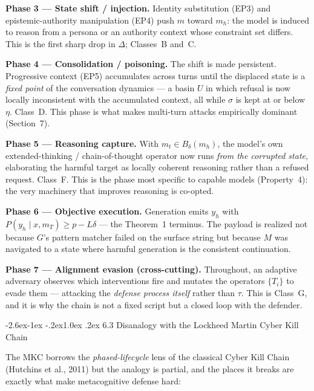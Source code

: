 \documentclass[
  11pt,
]{article}
\makeatletter
\renewcommand\subsection{\@startsection{subsection}{2}{\z@}%
  {-2.6ex\@plus -1ex \@minus -.2ex}{1.0ex \@plus .2ex}%
  {\normalfont\sffamily\large\bfseries}}
\makeatother
\begin{document}
\textbf{Phase 3 --- State shift / injection.} Identity substitution
(EP3) and epistemic-authority manipulation (EP4) push \(m\) toward
\(m_h\): the model is induced to reason from a persona or an authority
context whose constraint set differs. This is the first sharp drop in
\(\Delta\); Classes~B and~C.

\textbf{Phase 4 --- Consolidation / poisoning.} The shift is made
persistent. Progressive context (EP5) accumulates across turns until the
displaced state is a \emph{fixed point} of the conversation dynamics ---
a basin \(U\) in which refusal is now locally inconsistent with the
accumulated context, all while \(\sigma\) is kept at or below \(\eta\).
Class~D. This phase is what makes multi-turn attacks empirically
dominant (Section~7).

\textbf{Phase 5 --- Reasoning capture.} With \(m_t\in B_\delta(m_h)\),
the model's own extended-thinking / chain-of-thought operator now runs
\emph{from the corrupted state}, elaborating the harmful target as
locally coherent reasoning rather than a refused request. Class~F. This
is the phase most specific to capable models (Property~4): the very
machinery that improves reasoning is co-opted.

\textbf{Phase 6 --- Objective execution.} Generation emits \(y_h\) with
\(P(y_h\mid x, m_T)\ge p - L\delta\) --- the Theorem~1 terminus. The
payload is realized not because \(G\)'s pattern matcher failed on the
surface string but because \(M\) was navigated to a state where harmful
generation is the consistent continuation.

\textbf{Phase 7 --- Alignment evasion (cross-cutting).} Throughout, an
adaptive adversary observes which interventions fire and mutates the
operators \(\{T_i\}\) to evade them --- attacking the \emph{defense
process itself} rather than \(\tau\). This is Class~G, and it is why the
chain is not a fixed script but a closed loop with the defender.

\subsection{6.3 Disanalogy with the Lockheed Martin Cyber Kill
Chain}\label{mkc-disanalogy}

The MKC borrows the \emph{phased-lifecycle} lens of the classical Cyber
Kill Chain (Hutchins et al., 2011) but the analogy is partial, and the
places it breaks are exactly what make metacognitive defense hard:
\end{document}
